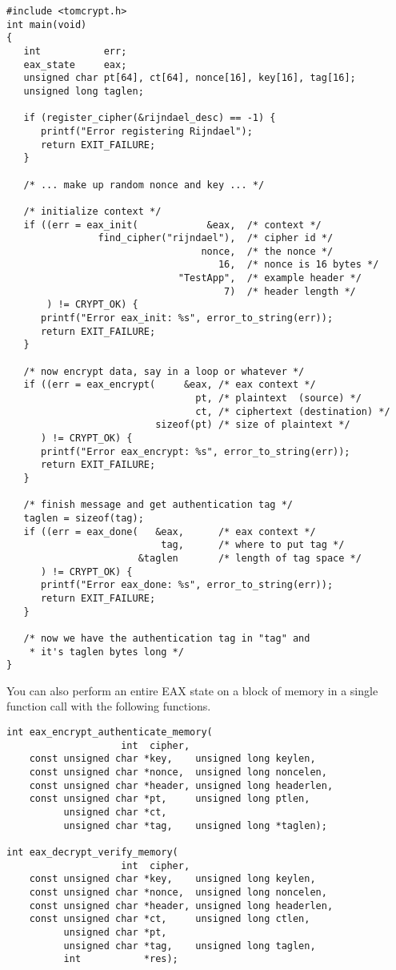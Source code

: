 \documentclass[synpaper]{book}
\begin{document}
\begin{verbatim}
#include <tomcrypt.h>
int main(void)
{
   int           err;
   eax_state     eax;
   unsigned char pt[64], ct[64], nonce[16], key[16], tag[16];
   unsigned long taglen;

   if (register_cipher(&rijndael_desc) == -1) {
      printf("Error registering Rijndael");
      return EXIT_FAILURE;
   }

   /* ... make up random nonce and key ... */

   /* initialize context */
   if ((err = eax_init(            &eax,  /* context */
                find_cipher("rijndael"),  /* cipher id */
                                  nonce,  /* the nonce */
                                     16,  /* nonce is 16 bytes */
                              "TestApp",  /* example header */
                                      7)  /* header length */
       ) != CRYPT_OK) {
      printf("Error eax_init: %s", error_to_string(err));
      return EXIT_FAILURE;
   }

   /* now encrypt data, say in a loop or whatever */
   if ((err = eax_encrypt(     &eax, /* eax context */
                                 pt, /* plaintext  (source) */
                                 ct, /* ciphertext (destination) */
                          sizeof(pt) /* size of plaintext */
      ) != CRYPT_OK) {
      printf("Error eax_encrypt: %s", error_to_string(err));
      return EXIT_FAILURE;
   }

   /* finish message and get authentication tag */
   taglen = sizeof(tag);
   if ((err = eax_done(   &eax,      /* eax context */
                           tag,      /* where to put tag */
                       &taglen       /* length of tag space */
      ) != CRYPT_OK) {
      printf("Error eax_done: %s", error_to_string(err));
      return EXIT_FAILURE;
   }

   /* now we have the authentication tag in "tag" and 
    * it's taglen bytes long */
}
\end{verbatim}
                       
You can also perform an entire EAX state on a block of memory in a single function call with the 
following functions.


 
\begin{verbatim}
int eax_encrypt_authenticate_memory(
                    int  cipher,
    const unsigned char *key,    unsigned long keylen,
    const unsigned char *nonce,  unsigned long noncelen,
    const unsigned char *header, unsigned long headerlen,
    const unsigned char *pt,     unsigned long ptlen,
          unsigned char *ct,
          unsigned char *tag,    unsigned long *taglen);

int eax_decrypt_verify_memory(
                    int  cipher,
    const unsigned char *key,    unsigned long keylen,
    const unsigned char *nonce,  unsigned long noncelen,
    const unsigned char *header, unsigned long headerlen,
    const unsigned char *ct,     unsigned long ctlen,
          unsigned char *pt,
          unsigned char *tag,    unsigned long taglen,
          int           *res);
\end{verbatim}
\end{document}
